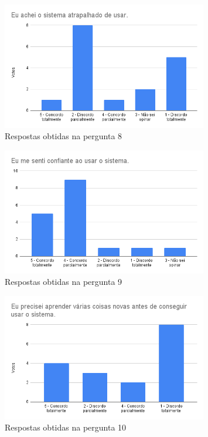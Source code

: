 \documentclass[12pt]{tcc}
\begin{document}
	\begin{figure}[!ht]
		\centering
		\includegraphics[width=0.8\textwidth]{figures/respostas-pergunta-8.png}
		\caption{Respostas obtidas na pergunta 8}
		\label{fig:respostas-pergunta-8}
	\end{figure}

	\begin{figure}[!ht]
		\centering
		\includegraphics[width=0.8\textwidth]{figures/respostas-pergunta-9.png}
		\caption{Respostas obtidas na pergunta 9}
		\label{fig:respostas-pergunta-9}
	\end{figure}

	\begin{figure}[!ht]
		\centering
		\includegraphics[width=0.8\textwidth]{figures/respostas-pergunta-10.png}
		\caption{Respostas obtidas na pergunta 10}
		\label{fig:respostas-pergunta-10}
	\end{figure}
\end{document}
